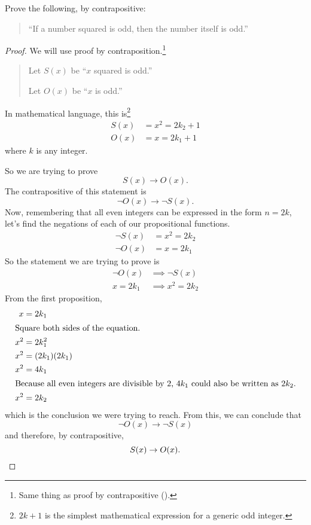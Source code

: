 \begin{ex}
  Prove the following, by contrapositive:
  \begin{quote}
  ``If a number squared is odd, then the number itself is odd.''
  \end{quote}
  \begin{proof}
    We will use proof by contraposition.\footnote{Same thing as proof by
      contrapositive ().}
    \begin{quote}
      Let $S(x)$ be ``$x$ squared is odd.''

      Let $O(x)$ be ``$x$ is odd.''
    \end{quote}
    In mathematical language, this is\footnote{$2k+1$ is the simplest mathematical expression for a generic odd integer.}
    \begin{align*}
      S(x) & = x^2 = 2k_2+1 \\
      O(x) & = x = 2k_1+1
    \end{align*}
    where $k$ is any integer.

    So we are trying to prove
    \[ S(x) \to O(x). \]
    The contrapositive of this statement is
    \[\neg O(x) \to \neg S(x).\]
    Now, remembering that all even integers can be expressed in the form $n=2k$, let's find the negations of each of our propositional functions.
    \begin{align*}
      \neg S(x) &= x^2 = 2k_2 \\
      \neg O(x) &= x = 2k_1
    \end{align*}
    So the statement we are trying to prove is
    \begin{align*}
      \neg O(x) &\implies \neg S(x) \\
      x = 2k_1 &\implies x^2=2k_2
    \end{align*}
    From the first proposition,
    \begin{align*}
      x &= 2k_1 \\
      \intertext{Square both sides of the equation.}
      x^2 &= 2k_1^2 \\
      x^2 &= (2k_1)(2k_1) \\
      x^2 &= 4k_1 \\
      \intertext{Because all even integers are divisible by $2$, $4k_1$ could also be written as $2k_2$.}
      x^2 &= 2k_2
    \end{align*}
    which is the conclusion we were trying to reach.
    From this, we can conclude that
    \[ \neg O(x) \to \neg S(x)\]
    and therefore, by contrapositive,
    \[ S(x)\to O(x).\qedhere\]
  \end{proof}
\end{ex}


